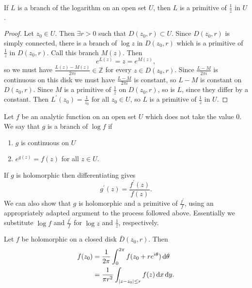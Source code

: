 \begin{theorem}
If $L$ is a branch of the logarithm on an open set $U$, then
$L$ is a primitive of $\frac{1}{z}$ in $U$.
\end{theorem}

\begin{proof}
Let $z_0 \in U$. Then $\exists r > 0$ such that $D(z_0, r) \subset U$.
Since $D(z_0, r)$ is simply connected, there is a branch of $\log z$
in $D(z_0, r)$ which is a primitive of $\frac{1}{z}$ in $D(z_0, r)$.
Call this branch $M(z)$. Then
$$
e^{L(z)} = z = e^{M(z)},
$$
so we must have $\frac{L(z) - M(z)}{2 \pi i} \in \mathbb{Z}$ for
every $z \in D(z_0, r)$. Since $\frac{L - M}{2 \pi i}$ is continuous
on this disk we must have $\frac{L - M}{2 \pi i}$ is constant, so
$L - M$ is constant on $D(z_0, r)$. Since $M$ is a primitive of
$\frac{1}{z}$ on $D(z_0, r)$, so is $L$, since they differ by a constant.
Then $L^\prime(z_0) = \frac{1}{z_0}$ for all $z_0 \in U$, so $L$ is a
primitive of $\frac{1}{z}$ in $U$.
\end{proof}

\begin{defn}
Let $f$ be an analytic function on an open set $U$
which does not take the value $0$. We say that $g$ is a branch of
$\log f$ if
\begin{enumerate}
  \item{
    $g$ is continuous on $U$
  }
  \item{
    $e^{g(z)} = f(z)$ for all $z \in U$.
  }
\end{enumerate}
If $g$ is holomorphic then differentiating gives
$$
g^\prime(z) = \frac{f^\prime(z)}{f(z)}.
$$
We can also show that $g$ is holomorphic and a primitive
of $\frac{f^\prime}{f}$, using an appropriately adapted argument
to the process followed above. Essentially
we substitute $\log f$ and $\frac{f^\prime}{f}$ for $\log z$ and
$\frac{1}{z}$, respectively.
\end{defn}

\begin{theorem}
Let $f$ be holomorphic on a closed disk $\bar{D}(z_0, r)$.
Then
\begin{align*}
   f(z_0)
&= \frac{1}{2 \pi}
   \int_0^{2\pi}
     f(z_0 + r e^{i \theta})
     \mathop{}\!\mathrm{d} \theta \\
&= \frac{1}{\pi r^2}
     \int_{|z - z_0| \leq r}
       f(z) \mathop{}\!\mathrm{d} x \mathop{}\!\mathrm{d} y.
\end{align*}
\end{theorem}

